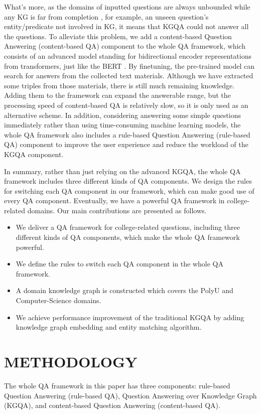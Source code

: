 \documentclass[11pt]{article}
\begin{document}
What's more, as the domains of inputted questions are always unbounded while any KG is far from completion \cite{c15}, for example, an unseen question's entity/predicate not involved in KG, it means that KGQA could not answer all the questions. To alleviate this problem, we add a content-based Question Answering (content-based QA) component to the whole QA framework, which consists of an advanced model standing for bidirectional encoder representations from transformers, just like the BERT \cite{c16}. By finetuning, the pre-trained model can search for answers from the collected text materials. Although we have extracted some triples from those materials, there is still much remaining knowledge. Adding them to the framework can expand the answerable range, but the processing speed of content-based QA is relatively slow, so it is only used as an alternative scheme. In addition, considering answering some simple questions immediately rather than using time-consuming machine learning models, the whole QA framework also includes a rule-based Question Answering (rule-based QA) component to improve the user experience and reduce the workload of the KGQA component.


In summary, rather than just relying on the advanced KGQA, the whole QA framework includes three different kinds of QA components. We design the rules for switching each QA component in our framework, which can make good use of every QA component. Eventually, we have a powerful QA framework in college-related domains. Our main contributions are presented as follows.
\begin{itemize}
  \item We deliver a QA framework for college-related questions, including three different kinds of QA components, which make the whole QA framework powerful.
  \item We define the rules to switch each QA component in the whole QA framework.
  \item A domain knowledge graph is constructed which covers the PolyU and Computer-Science domains.
  \item We achieve performance improvement of the traditional KGQA by adding knowledge graph embedding and entity matching algorithm.
\end{itemize}



\section{METHODOLOGY}
The whole QA framework in this paper has three components: rule-based Question Answering (rule-based QA), Question Answering over Knowledge Graph (KGQA), and content-based Question Answering (content-based QA).
\end{document}

